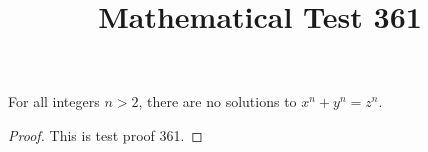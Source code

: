 \documentclass{amsart}
\begin{document}
\title{Mathematical Test 361}
\begin{theorem}
For all integers $n > 2$, there are no solutions to $x^n + y^n = z^n$.
\end{theorem}
\begin{proof}
This is test proof 361.
\end{proof}
\end{document}

